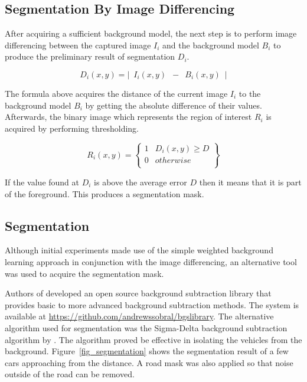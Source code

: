 \documentclass[conference]{IEEEtran}
\begin{document}
\subsection{Segmentation By Image Differencing}

After acquiring a sufficient background model, the next step is to perform image differencing between the captured image $I_i$ and the background model $B_i$ to produce the preliminary result of segmentation $D_i$.

$$
D_i(x,y) =  | \enspace I_i(x,y) \enspace - \enspace B_i(x,y) \enspace |
$$

The formula above acquires the distance of the current image $I_i$ to the background model $B_i$ by getting the absolute difference of their values. Afterwards, the binary image which represents the region of interest $R_i$ is acquired by performing thresholding.

$$
R_i(x,y) = \left\{
		\begin{array}{lr}
        1 & D_i(x,y) \geq D \\
        0 & otherwise\\
        \end{array}\right\}
$$

If the value found at $D_i$ is above the average error $D$ then it means that it is part of the foreground. This produces a segmentation mask.

\subsection{Segmentation}

Although initial experiments made use of the simple weighted background learning approach in conjunction with the image differencing, an alternative tool was used to acquire the segmentation mask.

Authors of \cite{Sobral} developed an open source background subtraction library that provides basic to more advanced background subtraction methods. The system is available at \url{https://github.com/andrewssobral/bgslibrary}. The alternative algorithm used for segmentation was the Sigma-Delta background subtraction algorithm by \cite{Manzanera}. The algorithm proved be effective in isolating the vehicles from the background. Figure~\ref{fig_segmentation} shows the segmentation result of a few cars approaching from the distance. A road mask was also applied so that noise outside of the road can be removed.
\end{document}
